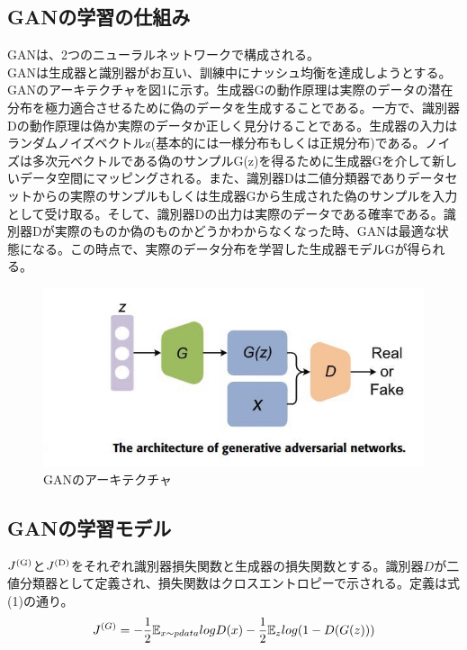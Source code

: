 \documentclass{jarticle}
\begin{document}
\subsection{GANの学習の仕組み}
GANは、2つのニューラルネットワークで構成される。\\

GANは生成器と識別器がお互い、訓練中にナッシュ均衡を達成しようとする。GANのアーキテクチャを図1に示す。生成器Gの動作原理は実際のデータの潜在分布を極力適合させるために偽のデータを生成することである。一方で、識別器Dの動作原理は偽か実際のデータか正しく見分けることである。生成器の入力はランダムノイズベクトルz(基本的には一様分布もしくは正規分布)である。ノイズは多次元ベクトルである偽のサンプルG(z)を得るために生成器Gを介して新しいデータ空間にマッピングされる。また、識別器Dは二値分類器でありデータセットからの実際のサンプルもしくは生成器Gから生成された偽のサンプルを入力として受け取る。そして、識別器Dの出力は実際のデータである確率である。識別器Dが実際のものか偽のものかどうかわからなくなった時、GANは最適な状態になる。この時点で、実際のデータ分布を学習した生成器モデルGが得られる。
\begin{figure}[h]
\centering
\includegraphics[width=14cm]{pic3.jpeg}
\caption{GANのアーキテクチャ}
\label{GANのアーキテクチャ}
\end{figure}

\subsection{GANの学習モデル}
$J\textsuperscript{(G)}$と$J\textsuperscript{(D)}$をそれぞれ識別器損失関数と生成器の損失関数とする。識別器$D$が二値分類器として定義され、損失関数はクロスエントロピーで示される。定義は式(1)の通り。\\
\begin{equation}
\centering
J^{(G)}=-\frac{1}{2}\mathbb{E}_{x\sim pdata}logD(x)-\frac{1}{2}\mathbb{E}_zlog(1-D(G(z)))
\end{equation}
\end{document}
